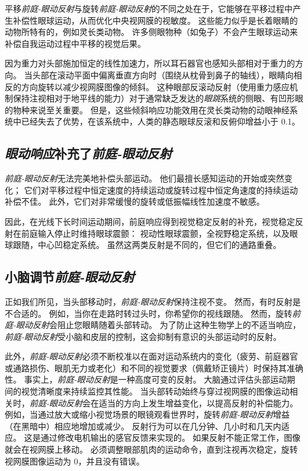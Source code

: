 平移\textit{前庭-眼动反射}与旋转\textit{前庭-眼动反射}的不同之处在于，它能够在平移过程中产生补偿性眼球运动，从而优化中央视网膜的视敏度。
这些能力似乎是长着眼睛的动物所特有的，例如灵长类动物。
许多侧眼物种（如兔子）不会产生眼球运动来补偿自我运动过程中平移的视觉后果。


因为重力对头部施加恒定的线性加速力，所以耳石器官也感知头部相对于重力的方向。
当头部在滚动平面中偏离垂直方向时（围绕从枕骨到鼻子的轴线），眼睛向相反的方向旋转以减少视网膜图像的倾斜。
这种眼部反滚动反射（使用重力感应机制保持注视相对于地平线的能力）对于通常缺乏发达的\textit{眼跳}系统的侧眼、有凹形眼的物种来说至关重要。
但是，这些倾斜响应功能效用在灵长类动物的动眼神经系统中已经失去了优势，在该系统中，人类的静态眼球反滚和反俯仰增益小于 0.1。



\subsection{\textit{眼动响应}补充了\textit{前庭-眼动反射}}

\textit{前庭-眼动反射}无法完美地补偿头部运动。
他们最擅长感知运动的开始或突然变化；
它们对平移过程中恒定速度的持续运动或旋转过程中恒定角速度的持续运动补偿不佳。
此外，它们对非常缓慢的旋转或低振幅线性加速度不敏感。


因此，在光线下长时间运动期间，前庭响应得到视觉稳定反射的补充，视觉稳定反射在前庭输入停止时维持眼球震颤：
视动性眼球震颤，全视野稳定系统，以及眼球跟随，中心凹稳定系统。
虽然这两类反射是不同的，但它们的通路重叠。



\subsection{小脑调节\textit{前庭-眼动反射}}

正如我们所见，当头部移动时，\textit{前庭-眼动反射}保持注视不变。
然而，有时反射是不合适的。
例如，当你在走路时转过头时，你希望你的视线跟随。
然而，旋转\textit{前庭-眼动反射}会阻止您眼睛随着头部转动。
为了防止这种生物学上的不适当响应，\textit{前庭-眼动反射}受小脑和皮层的控制，这会抑制有意识的头部运动时的反射。


此外，\textit{前庭-眼动反射}必须不断校准以在面对运动系统内的变化（疲劳、前庭器官或通路损伤、眼肌无力或老化）和不同的视觉要求（佩戴矫正镜片）时保持其准确性。
事实上，\textit{前庭-眼动反射}是一种高度可变的反射。
大脑通过评估头部运动期间的视觉清晰度来持续监控其性能。
当头部转动始终与穿过视网膜的图像运动相关时，\textit{前庭-眼动反射}会在适当的方向上发生增益变化，以提高反射的补偿能力。
例如，当通过放大或缩小视觉场景的眼镜观看世界时，旋转\textit{前庭-眼动反射}增益（在黑暗中）相应地增加或减少。
反射行为可以在几分钟、几小时和几天内适应。
这是通过修改电机输出的感官反馈来实现的。
如果反射不能正常工作，图像就会在视网膜上移动。
必须调整眼部肌肉的运动命令，直到注视再次稳定，旋转视网膜图像运动为 0，并且没有错误。


